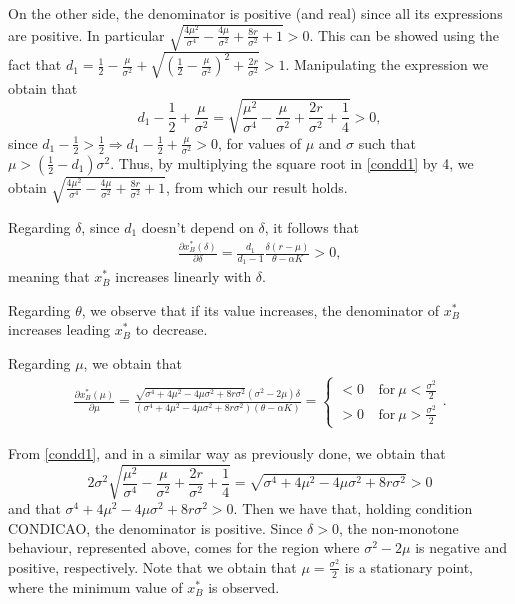 On the other side, the denominator is positive (and real) since all its expressions are positive. In particular $\sqrt{\frac{4 \mu ^2}{\sigma ^4}-\frac{4 \mu }{\sigma ^2}+\frac{8 r}{\sigma ^2}+1}>0$.
This can be showed using the fact that $d_1=\frac{1}{2}-\frac{\mu}{\sigma^2} +\sqrt{\left( \frac{1}{2} -\frac{\mu}{\sigma^2} \right) ^2+ \frac{2r}{\sigma^2}}>1$. Manipulating the expression we obtain that
\begin{equation}
 d_1-\frac{1}{2}+\frac{\mu}{\sigma^2}= \sqrt{ \frac{\mu^2}{\sigma^4}-\frac{\mu}{\sigma^2} +\frac{2r}{\sigma^2}+\frac{1}{4} }>0,
 \label{condd1}
\end{equation}
 since $d_1-\frac{1}{2}>\frac{1}{2} \Rightarrow d_1-\frac{1}{2}+\frac{\mu}{\sigma^2}>0$, for values of $\mu$ and $\sigma$ such that $\mu>\left( \frac{1}{2}-d_1 \right) \sigma^2$. Thus, by multiplying the square root in \eqref{condd1} by 4, we obtain  $\sqrt{\frac{4 \mu ^2}{\sigma ^4}-\frac{4 \mu }{\sigma ^2}+\frac{8 r}{\sigma ^2}+1}$, from which our result holds.
 
 
 Regarding $\delta$, since $d_1$ doesn't depend on $\delta$, it follows that
 \begin{align*}
 \frac{\partial x^*_B (\delta)}{\partial \delta}= \frac{d_1}{d_1-1} \frac{\delta (r-\mu)}{\theta-\alpha K}>0,
 \end{align*}
 meaning that $x^*_B$ increases linearly with $\delta$.
 
 Regarding $\theta$, we observe that if its value increases, the denominator of $x^*_B$ increases leading $x^*_B$ to decrease.
 
 Regarding $\mu$, we obtain that
 \begin{align*}
 \frac{\partial x^*_B (\mu)}{\partial \mu}=\frac{\sqrt{\sigma^4+4 \mu^2 -4 \mu\sigma^2+8r\sigma^2}(\sigma^2-2\mu)\delta}{(\sigma^4+4 \mu^2 -4 \mu\sigma^2+8r\sigma^2)(\theta-\alpha K )} =
 \begin{cases}
 <0 &\ \text{for} \ \mu<\frac{\sigma^2}{2}\\
 >0 &\ \text{for} \ \mu>\frac{\sigma^2}{2}
 \end{cases}.
 \end{align*}
 
 From \eqref{condd1}, and in a similar way as previously done, we obtain that
 $$2 \sigma^2 \sqrt{ \frac{\mu^2}{\sigma^4}-\frac{\mu}{\sigma^2} +\frac{2r}{\sigma^2}+\frac{1}{4} }= \sqrt{ \sigma^4+4 \mu^2 -4 \mu\sigma^2+8r\sigma^2}>0$$
 and that $\sigma^4+4 \mu^2 -4 \mu\sigma^2+8r\sigma^2>0$. Then we have that, holding condition CONDICAO, the denominator is positive. Since $\delta>0$, the non-monotone behaviour, represented above, comes for the region where $\sigma^2-2\mu$ is negative and positive, respectively. Note that we obtain that $\mu=\frac{\sigma^2}{2}$ is a stationary point, where the minimum value of $x^*_B$ is observed.
 
